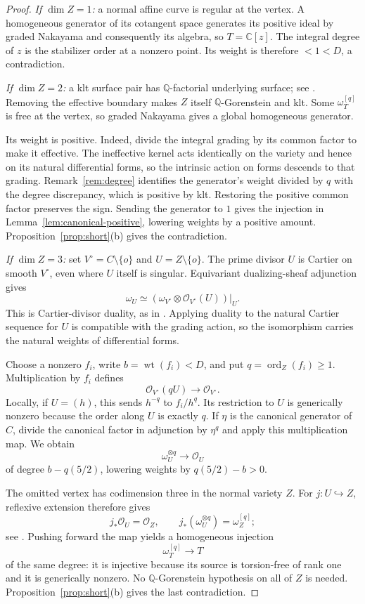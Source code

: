 \documentclass[11pt]{article}
\theoremstyle{definition}
\theoremstyle{remark}
\numberwithin{equation}{section}
\newcommand{\C}{\mathbb C}
\newcommand{\Q}{\mathbb Q}
\newcommand{\wt}{\operatorname{wt}}
\newcommand{\ord}{\operatorname{ord}}
\newcommand{\cO}{\mathcal O}
\begin{document}
\begin{proof}
\emph{If \(\dim Z=1\):}
a normal affine curve is regular at the vertex. A homogeneous generator of its cotangent space generates its positive ideal by graded Nakayama and consequently its algebra, so \(T=\C[z]\). The integral degree of \(z\) is the stabilizer order at a nonzero point. Its weight is therefore \(<1<D\), a contradiction.

\emph{If \(\dim Z=2\):}
a klt surface pair has \(\Q\)-factorial underlying surface; see \cite[Proposition~7.2 and Corollary~7.15]{dFH}. Removing the effective boundary makes \(Z\) itself \(\Q\)-Gorenstein and klt. Some \(\omega_T^{[q]}\) is free at the vertex, so graded Nakayama gives a global homogeneous generator.

Its weight is positive. Indeed, divide the integral grading by its common factor to make it effective. The ineffective kernel acts identically on the variety and hence on its natural differential forms, so the intrinsic action on forms descends to that grading. Remark~\ref{rem:degree} identifies the generator's weight divided by \(q\) with the degree discrepancy, which is positive by klt. Restoring the positive common factor preserves the sign. Sending the generator to \(1\) gives the injection in Lemma~\ref{lem:canonical-positive}, lowering weights by a positive amount. Proposition~\ref{prop:short}(b) gives the contradiction.

\emph{If \(\dim Z=3\):}
set \(V^\circ=C\setminus\{o\}\) and \(U=Z\setminus\{o\}\). The prime divisor \(U\) is Cartier on smooth \(V^\circ\), even where \(U\) itself is singular. Equivariant dualizing-sheaf adjunction gives
\[
\omega_U\simeq
(\omega_{V^\circ}\otimes\cO_{V^\circ}(U))|_U.
\]
This is Cartier-divisor duality, as in \cite[Section~48.14]{Stacks}. Applying duality to the natural Cartier sequence for \(U\) is compatible with the grading action, so the isomorphism carries the natural weights of differential forms.

Choose a nonzero \(f_i\), write \(b=\wt(f_i)<D\), and put \(q=\ord_Z(f_i)\ge1\). Multiplication by \(f_i\) defines
\[
\cO_{V^\circ}(qU)\longrightarrow\cO_{V^\circ}.
\]
Locally, if \(U=(h)\), this sends \(h^{-q}\) to \(f_i/h^q\). Its restriction to \(U\) is generically nonzero because the order along \(U\) is exactly \(q\). If \(\eta\) is the canonical generator of \(C\), divide the canonical factor in adjunction by \(\eta^q\) and apply this multiplication map. We obtain
\[
\omega_U^{\otimes q}\longrightarrow\cO_U
\]
of degree \(b-q(5/2)\), lowering weights by \(q(5/2)-b>0\).

The omitted vertex has codimension three in the normal variety \(Z\). For \(j:U\hookrightarrow Z\), reflexive extension therefore gives
\[
j_*\cO_U=\cO_Z,\qquad
j_*(\omega_U^{\otimes q})=\omega_Z^{[q]};
\]
see \cite[Lemma~31.13.12]{Stacks}. Pushing forward the map yields a homogeneous injection
\[
\omega_T^{[q]}\longrightarrow T
\]
of the same degree: it is injective because its source is torsion-free of rank one and it is generically nonzero. No \(\Q\)-Gorenstein hypothesis on all of \(Z\) is needed. Proposition~\ref{prop:short}(b) gives the last contradiction.
\end{proof}
\end{document}
